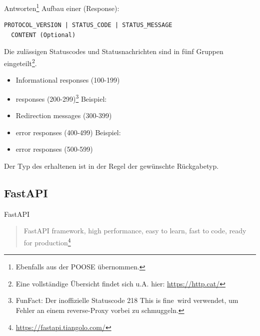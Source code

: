 \documentclass[12pt, aspectratio=169, usepdftitle=false]{beamer}
\newcommand{\furl}[1]{\footnote{\url{#1}}}
\begin{document}
\begin{frame}[fragile]{Antworten\footnote{Ebenfalls aus der POOSE übernommen.}}
    Aufbau einer  (Response):
    
    \begin{lstlisting}[language=pltiny]
  PROTOCOL_VERSION | STATUS_CODE | STATUS_MESSAGE
  CONTENT (Optional)
    \end{lstlisting}\pause
    
    Die zulässigen Statuscodes und Statusnachrichten sind in fünf Gruppen eingeteilt\footnote{Eine vollständige Übersicht findet sich u.A. hier: \url{https://http.cat/}}.
    \begin{itemize}
      \item Informational responses (100-199)
      \item {} responses (200-299)\footnote{FunFact: Der inoffizielle Statuscode 218 \glqq This is fine\grqq\ wird verwendet, um Fehler an einem reverse-Proxy vorbei zu schmuggeln.} Beispiel: 
      \item Redirection messages (300-399)
      \item {} error responses (400-499) Beispiel: 
      \item {} error responses (500-599)
    \end{itemize}\pause
    
    Der Typ des erhaltenen  ist in der Regel der gewünschte Rückgabetyp.
    
  \end{frame}

\subsection{FastAPI}

\begin{frame}{FastAPI}
    \begin{quotation}
        FastAPI framework, high performance, easy to learn, fast to code, ready for production\furl{https://fastapi.tiangolo.com/}
    \end{quotation}
\end{frame}
\end{document}
